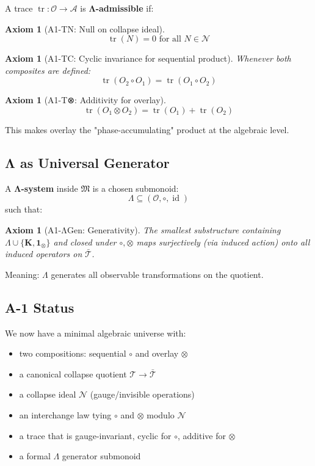 \documentclass[12pt, oneside]{article}
\newtheorem{axiom}[theorem]{Axiom}
\DeclareMathOperator{\id}{id}
\DeclareMathOperator{\tr}{tr}
\newcommand{\K}{\mathbf{K}}
\newcommand{\N}{\mathcal{N}}
\newcommand{\A}{\mathcal{A}}
\newcommand{\T}{\mathcal{T}}
\newcommand{\Opr}{\mathcal{O}}
\newcommand{\mf}[1]{\mathfrak{#1}}
\begin{document}
A trace $\tr: \Opr \rightarrow \A$ is \textbf{Λ-admissible} if:

\begin{axiom}[A1-TN: Null on collapse ideal]
\begin{equation}
\tr(N) = 0 \text{ for all } N \in \N
\end{equation}
\end{axiom}

\begin{axiom}[A1-TC: Cyclic invariance for sequential product]
Whenever both composites are defined:
\begin{equation}
\tr(O_2 \circ O_1) = \tr(O_1 \circ O_2)
\end{equation}
\end{axiom}

\begin{axiom}[A1-T⊗: Additivity for overlay]
\begin{equation}
\tr(O_1 \otimes O_2) = \tr(O_1) + \tr(O_2)
\end{equation}
\end{axiom}

This makes overlay the "phase-accumulating" product at the algebraic level.

\subsection{Λ as Universal Generator}

A \textbf{Λ-system} inside $\mf{M}$ is a chosen submonoid:
\begin{equation}
\Lambda \subseteq (\Opr, \circ, \id)
\end{equation}
such that:

\begin{axiom}[A1-ΛGen: Generativity]
The smallest substructure containing $\Lambda \cup \{\K, \mathbf{1}_\otimes\}$ and closed under $\circ, \otimes$ maps surjectively (via induced action) onto all induced operators on $\bar{\T}$.
\end{axiom}

Meaning: $\Lambda$ generates all observable transformations on the quotient.

\subsection{A-1 Status}

We now have a minimal algebraic universe with:
\begin{itemize}
    \item two compositions: sequential $\circ$ and overlay $\otimes$
    \item a canonical collapse quotient $\T \rightarrow \bar{\T}$
    \item a collapse ideal $\N$ (gauge/invisible operations)
    \item an interchange law tying $\circ$ and $\otimes$ modulo $\N$
    \item a trace that is gauge-invariant, cyclic for $\circ$, additive for $\otimes$
    \item a formal $\Lambda$ generator submonoid
\end{itemize}
\end{document}
